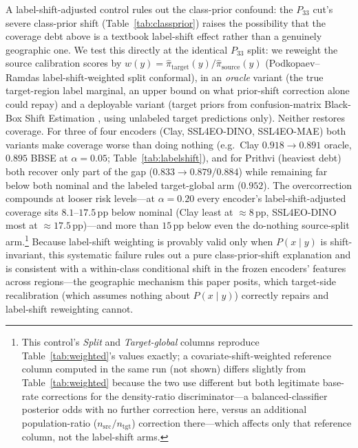 \documentclass[journal]{IEEEtran}
\renewcommand{\_}{\textunderscore\allowbreak}
\begin{document}
A label-shift-adjusted control rules out the class-prior confound: the $P_{33}$ cut's
severe class-prior shift (Table~\ref{tab:classprior}) raises the possibility that the
coverage debt above is a textbook label-shift effect \citep{podkopaev2021labelshift} rather than a
genuinely geographic one. We test this directly at the identical $P_{33}$ split: we reweight the
source calibration scores by $w(y)=\hat\pi_{\text{target}}(y)/\hat\pi_{\text{source}}(y)$
(Podkopaev--Ramdas label-shift-weighted split conformal), in an \emph{oracle} variant (the true
target-region label marginal, an upper bound on what prior-shift correction alone could repay) and a
deployable variant (target priors from confusion-matrix Black-Box Shift Estimation
\citep{lipton2018bbse}, using unlabeled target predictions only). Neither restores
coverage. For three of four encoders (Clay, SSL4EO-DINO, SSL4EO-MAE) both variants make coverage
worse than doing nothing (e.g.\ Clay $0.918\to0.891$ oracle, $0.895$ BBSE at $\alpha=0.05$;
Table~\ref{tab:labelshift}), and for Prithvi (heaviest debt) both recover only part of the gap
($0.833\to0.879/0.884$) while remaining far below both nominal and the labeled target-global arm
($0.952$). The overcorrection compounds at looser risk levels---at $\alpha=0.20$ every encoder's
label-shift-adjusted coverage sits $8.1$--$17.5$\,pp below nominal (Clay least at ${\approx}8$\,pp,
SSL4EO-DINO most at ${\approx}17.5$\,pp)---and more than $15$\,pp below even the do-nothing source-split
arm.\footnote{This control's
\emph{Split} and \emph{Target-global} columns reproduce Table~\ref{tab:weighted}'s values exactly; a
covariate-shift-weighted reference column computed in the same run (not shown) differs slightly from
Table~\ref{tab:weighted} because the two use different but both legitimate base-rate corrections for
the density-ratio discriminator---a balanced-classifier posterior odds with no further correction
here, versus an additional population-ratio ($n_{\text{src}}/n_{\text{tgt}}$) correction there---which
affects only that reference column, not the label-shift arms.} Because label-shift weighting is
provably valid only when $P(x\mid y)$ is shift-invariant, this systematic failure rules out a pure
class-prior-shift explanation and is consistent with a within-class conditional shift in the frozen
encoders' features across regions---the geographic mechanism this paper posits, which target-side
recalibration (which assumes nothing about $P(x\mid y)$) correctly repairs and label-shift reweighting
cannot.
\end{document}
